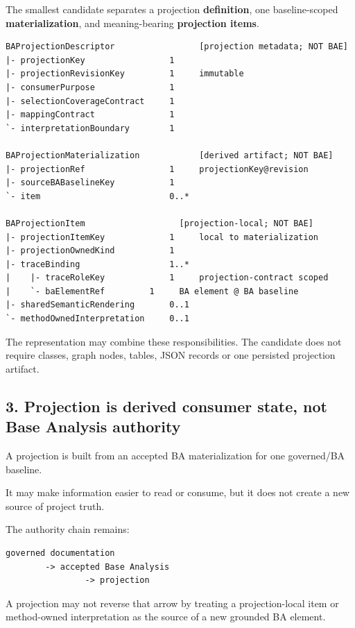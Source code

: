 \documentclass[11pt,a4paper]{article}
\begin{document}
The smallest candidate separates a projection \textbf{definition}, one baseline-scoped \textbf{materialization}, and meaning-bearing \textbf{projection items}.

\begin{verbatim}
BAProjectionDescriptor                 [projection metadata; NOT BAE]
|- projectionKey                 1
|- projectionRevisionKey         1     immutable
|- consumerPurpose               1
|- selectionCoverageContract     1
|- mappingContract               1
`- interpretationBoundary        1

BAProjectionMaterialization            [derived artifact; NOT BAE]
|- projectionRef                 1     projectionKey@revision
|- sourceBABaselineKey           1
`- item                          0..*

BAProjectionItem                   [projection-local; NOT BAE]
|- projectionItemKey             1     local to materialization
|- projectionOwnedKind           1
|- traceBinding                  1..*
|    |- traceRoleKey             1     projection-contract scoped
|    `- baElementRef         1     BA element @ BA baseline
|- sharedSemanticRendering       0..1
`- methodOwnedInterpretation     0..1
\end{verbatim}

The representation may combine these responsibilities. The candidate does not require classes, graph nodes, tables, JSON records or one persisted projection artifact.

\subsection{3. Projection is derived consumer state, not Base Analysis authority}\label{3-projection-is-derived-consumer-state-not-base-analysis-authority}

A projection is built from an accepted BA materialization for one governed/BA baseline.

It may make information easier to read or consume, but it does not create a new source of project truth.

The authority chain remains:

\begin{verbatim}
governed documentation
        -> accepted Base Analysis
                -> projection
\end{verbatim}

A projection may not reverse that arrow by treating a projection-local item or method-owned interpretation as the source of a new grounded BA element.
\end{document}

